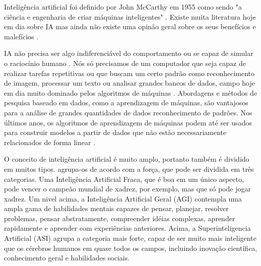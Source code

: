 Inteligência artificial foi definido por John McCarthy em 1955 como sendo "a ciência e engenharia de criar máquinas inteligentes" \cite{hamet2017artificial}. Existe muita literatura hoje em dia sobre IA mas ainda não existe uma opinão geral sobre os seus benefícios e malefícios \cite{hamet2017artificial}.

IA não precisa ser algo indiferenciável do comportamento ou se capaz de simular o raciocínio humano \cite{verganti2020innovation}. Nós só precisamos de um computador que seja capaz de realizar tarefas repetitivas ou que buscam um certo padrão como reconhecimento de imagem, processar um texto ou analisar grandes bancos de dados, campo hoje em dia muito dominado pelos algoritmos de máquinas \cite{verganti2020innovation, chen_artificial_2019}. Abordagens e métodos de pesquisa baseado em dados, como a aprendizagem de máquinas, são vantajosos para a análise de grandes quantidades de dados reconhecimento de padrões. Nos últimos anos, os algoritmos de aprendizagem de máquinas podem até ser usados para construir modelos a partir de dados que não estão necessariamente relacionados de forma linear \cite{edwards_if_2022}.

O conceito de inteligência artificial é muito amplo, portanto também é dividido em muitos tipos.  agrupa-os de acordo com a força, que pode ser dividida em três categorias. Uma Inteligência Artificial Fraca, que é boa em um único aspecto, pode vencer o campeão mundial de xadrez, por exemplo, mas que só pode jogar xadrez. Um nivel acima, a Inteligência Artificial Geral (AGI) contempla uma ampla gama de habilidades mentais capazes de pensar, planejar, resolver problemas, pensar abstratamente, compreender idéias complexas, aprender rapidamente e aprender com experiências anteriores. Acima, a Superinteligencia Artificial (ASI) agrupa a categoria mais forte, capaz de ser muito mais inteligente que os cérebros humanos em quase todos os campos, incluindo inovação científica, conhecimento geral e habilidades sociais. 
